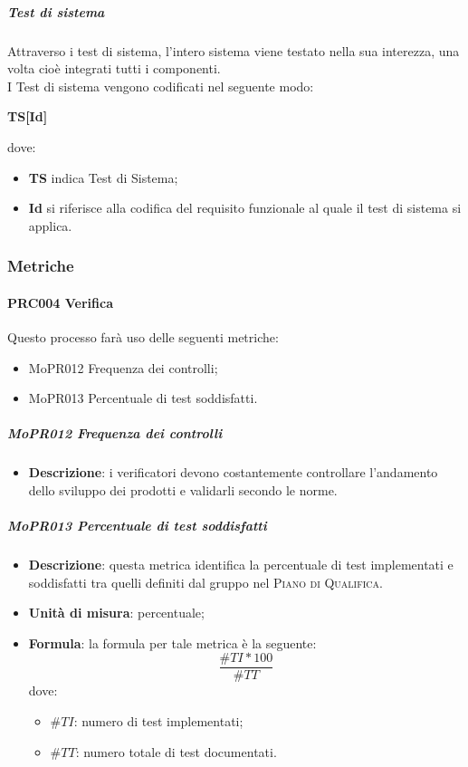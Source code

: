 \documentclass[../norme-di-progetto.tex]{subfiles}
\begin{document}
\subparagraph*{Test di sistema}
Attraverso i test di sistema, l'intero sistema viene testato nella sua interezza, una volta cioè integrati tutti i componenti. \\
I Test di sistema vengono codificati nel seguente modo:
\begin{center}
  \centering
  \textbf{TS[Id]}
\end{center} dove:
\begin{itemize}
  \item \textbf{TS} indica Test di Sistema;
  \item \textbf{Id} si riferisce alla codifica del requisito funzionale al quale il test di sistema si applica.
\end{itemize}

\subsubsection{Metriche}
\paragraph{PRC004 Verifica}
Questo processo farà uso delle seguenti metriche:
\begin{itemize}
  \item MoPR012 Frequenza dei controlli;
  \item MoPR013 Percentuale di test soddisfatti.
\end{itemize}
\subparagraph{MoPR012 Frequenza dei controlli}
\begin{itemize}
  \item \textbf{Descrizione}: i verificatori devono costantemente controllare l'andamento dello sviluppo dei prodotti e validarli secondo le norme.
\end{itemize}

\subparagraph{MoPR013 Percentuale di test soddisfatti}
\begin{itemize}
  \item \textbf{Descrizione}: questa metrica identifica la percentuale di test implementati e soddisfatti tra quelli definiti dal gruppo nel \textsc{Piano di Qualifica}.
  \item \textbf{Unità di misura}: percentuale;
  \item \textbf{Formula}: la formula per tale metrica è la seguente:
  \begin{displaymath}
    \frac{\#TI * 100}{\#TT}
  \end{displaymath}
  dove:
  \begin{itemize}
    \item $ \#TI $: numero di test implementati;
    \item $ \#TT $: numero totale di test documentati.
  \end{itemize}
\end{itemize}
\end{document}

